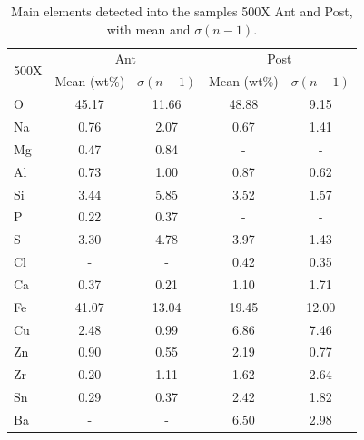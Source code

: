 \begin{table}[H]\centering
  \begin{tabular}{lcccc}
    \toprule
    \multirow{2}{*}[-0.5\dimexpr \aboverulesep + \belowrulesep + \cmidrulewidth]{500X}
    & \multicolumn{2}{c}{Ant} & \multicolumn{2}{c}{Post} \\
    \cmidrule(l){2-3} \cmidrule(l){4-5}
    & Mean (wt\%) & $\sigma (n-1)$ & Mean (wt\%) & $\sigma (n-1)$ \\
    \midrule
    O & 45.17 & 11.66 & 48.88 & 9.15 \\
    Na & 0.76 & 2.07 & 0.67 & 1.41 \\
    Mg & 0.47 & 0.84 & - & - \\
    Al & 0.73 & 1.00 & 0.87 & 0.62 \\
    Si & 3.44 & 5.85 & 3.52 & 1.57 \\
    P & 0.22 & 0.37 & - & - \\
    S & 3.30 & 4.78 & 3.97 & 1.43 \\
    Cl & - & - & 0.42 & 0.35 \\
    Ca & 0.37 & 0.21 & 1.10 & 1.71 \\
    Fe & 41.07 & 13.04 & 19.45 & 12.00 \\
    Cu & 2.48 & 0.99 & 6.86 & 7.46 \\
    Zn & 0.90 & 0.55 & 2.19 & 0.77 \\
    Zr & 0.20 & 1.11 & 1.62 & 2.64 \\
    Sn & 0.29 & 0.37 & 2.42 & 1.82 \\
    Ba & - & - & 6.50 & 2.98 \\
    \bottomrule
  \end{tabular}
    \caption{Main elements detected into the samples 500X Ant and Post, with mean and $\sigma (n-1)$.}
    \label{fig:Elements_500X}
\end{table}

